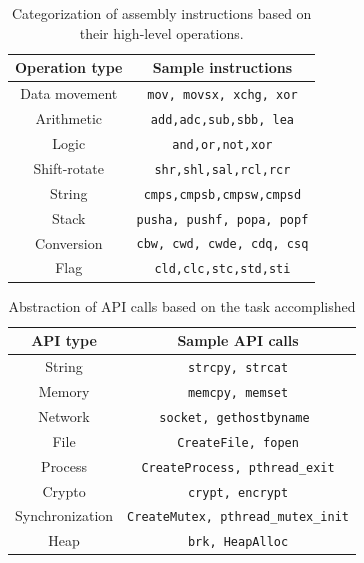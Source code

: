 \begin{table}[t]
\caption{Categorization of assembly instructions based on their high-level operations.}\label{tab:opt-cat}
\begin{center}
{\scriptsize
\begin{tabular}{|c|c|}
  \hline
  \textbf{Operation type} & \textbf{Sample instructions} \\
  \hline
  Data movement & \texttt{mov, movsx, xchg, xor}\\
  \hline
  Arithmetic  & \texttt{add,adc,sub,sbb, lea} \\
  \hline
  Logic & \texttt{and,or,not,xor}\\
  \hline
  Shift-rotate & \texttt{shr,shl,sal,rcl,rcr}\\
  \hline
  String  & \texttt{cmps,cmpsb,cmpsw,cmpsd} \\
  \hline
  Stack  & \texttt{pusha, pushf, popa, popf} \\
  \hline
  Conversion & \texttt{cbw, cwd, cwde, cdq, csq}\\
  \hline
 Flag  & \texttt{cld,clc,stc,std,sti} \\
  \hline
  \end{tabular}
}
\end{center}
\end{table}

\begin{table}[t]
\caption{Abstraction of API calls based on the task accomplished}\label{tab:lib-cat}
\begin{center}
{\scriptsize
\begin{tabular}{|c|c|}
  \hline
  \textbf{API type} & \textbf{Sample API calls} \\
  \hline
  String & \texttt{strcpy, strcat}\\
  \hline
  Memory  & \texttt{memcpy, memset} \\
  \hline
  Network & \texttt{socket, gethostbyname }\\
  \hline
   File & \texttt{CreateFile, fopen}\\
  \hline
  Process  & \texttt{CreateProcess, pthread\_exit} \\
  \hline
 Crypto & \texttt{crypt, encrypt}\\
  \hline
  Synchronization  & \texttt{CreateMutex, pthread\_mutex\_init} \\
  \hline
  Heap & \texttt{brk, HeapAlloc}\\
  \hline
  \end{tabular}
}
\end{center}
\end{table}

